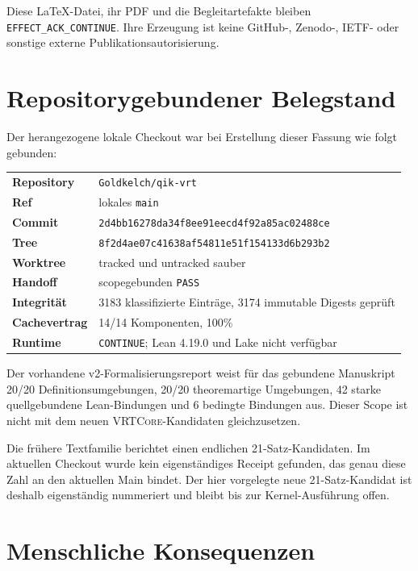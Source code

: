 \documentclass[11pt,a4paper]{article}
\newcommand{\VRTCore}{\textsc{VRTCore}}
\newcommand{\code}[1]{\texttt{#1}}
\begin{document}
Diese LaTeX-Datei, ihr PDF und die Begleitartefakte bleiben
\code{EFFECT\_ACK\_CONTINUE}. Ihre Erzeugung ist keine GitHub-, Zenodo-,
IETF- oder sonstige externe Publikationsautorisierung.

\section{Repositorygebundener Belegstand}

Der herangezogene lokale Checkout war bei Erstellung dieser Fassung wie folgt
gebunden:

\begin{center}
\begin{tabularx}{\textwidth}{>{\bfseries}l X}
\toprule
Repository & \code{Goldkelch/qik-vrt} \\
Ref & lokales \code{main} \\
Commit & \code{2d4bb16278da34f8ee91eecd4f92a85ac02488ce} \\
Tree & \code{8f2d4ae07c41638af54811e51f154133d6b293b2} \\
Worktree & tracked und untracked sauber \\
Handoff & scopegebunden \code{PASS} \\
Integrität & 3183 klassifizierte Einträge, 3174 immutable Digests geprüft \\
Cachevertrag & 14/14 Komponenten, 100\% \\
Runtime & \code{CONTINUE}; Lean 4.19.0 und Lake nicht verfügbar \\
\bottomrule
\end{tabularx}
\end{center}

Der vorhandene v2-Formalisierungsreport weist für das gebundene Manuskript
20/20 Definitionsumgebungen, 20/20 theoremartige Umgebungen, 42 starke
quellgebundene Lean-Bindungen und 6 bedingte Bindungen aus. Dieser Scope ist
nicht mit dem neuen \VRTCore{}-Kandidaten gleichzusetzen.

Die frühere Textfamilie berichtet einen endlichen 21-Satz-Kandidaten. Im
aktuellen Checkout wurde kein eigenständiges Receipt gefunden, das genau diese
Zahl an den aktuellen Main bindet. Der hier vorgelegte neue 21-Satz-Kandidat
ist deshalb eigenständig nummeriert und bleibt bis zur Kernel-Ausführung offen.

\section{Menschliche Konsequenzen}
\end{document}
